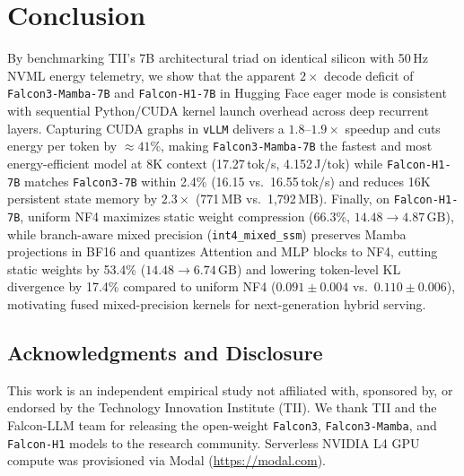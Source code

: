 \documentclass[10pt,a4paper]{article}
\begin{document}
\section{Conclusion}
By benchmarking TII's 7B architectural triad on identical silicon with 50\,Hz NVML energy telemetry, we show that the apparent $2\times$ decode deficit of \texttt{Falcon3-Mamba-7B} and \texttt{Falcon-H1-7B} in Hugging Face eager mode is consistent with sequential Python/CUDA kernel launch overhead across deep recurrent layers. Capturing CUDA graphs in \texttt{vLLM} delivers a $1.8\text{--}1.9\times$ speedup and cuts energy per token by $\approx 41\%$, making \texttt{Falcon3-Mamba-7B} the fastest and most energy-efficient model at 8K context (17.27\,tok/s, 4.152\,J/tok) while \texttt{Falcon-H1-7B} matches \texttt{Falcon3-7B} within 2.4\% (16.15 vs.\ 16.55\,tok/s) and reduces 16K persistent state memory by $2.3\times$ (771\,MB vs.\ 1,792\,MB). Finally, on \texttt{Falcon-H1-7B}, uniform NF4 maximizes static weight compression (66.3\%, $14.48 \to 4.87\,\text{GB}$), while branch-aware mixed precision (\texttt{int4\_\allowbreak mixed\_\allowbreak ssm}) preserves Mamba projections in BF16 and quantizes Attention and MLP blocks to NF4, cutting static weights by 53.4\% ($14.48 \to 6.74\,\text{GB}$) and lowering token-level KL divergence by 17.4\% compared to uniform NF4 ($0.091 \pm 0.004$ vs.\ $0.110 \pm 0.006$), motivating fused mixed-precision kernels for next-generation hybrid serving.

\subsection*{Acknowledgments and Disclosure}
This work is an independent empirical study not affiliated with, sponsored by, or endorsed by the Technology Innovation Institute (TII). We thank TII and the Falcon-LLM team for releasing the open-weight \texttt{Falcon3}, \texttt{Falcon3-Mamba}, and \texttt{Falcon-H1} models to the research community. Serverless NVIDIA L4 GPU compute was provisioned via Modal (\url{https://modal.com}).
\end{document}

